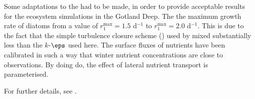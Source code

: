 Some adaptations to the \cite{Neumannetal2002} had to be made,
in order to provide acceptable results for the
ecosystem simulations in the Gotland Deep. The 
the maximum growth rate of diatoms from
a value of $r_1^{\max}=1.5$ d$^{-1}$ to $r_1^{\max}=2.0$ d$^{-1}$.
This is due to the fact that the simple turbulence closure scheme
(\cite{Pacanowski81})
used by \cite{Neumannetal2002} mixed substantially less than the
$k$-$\eps$ used here.
The surface
fluxes of nutrients have been calibrated in such a way that
winter nutrient concentrations are close to observations.
By doing do, the effect of lateral nutrient transport is
parameterised.

For further details, see \cite{Burchardetal05}.
